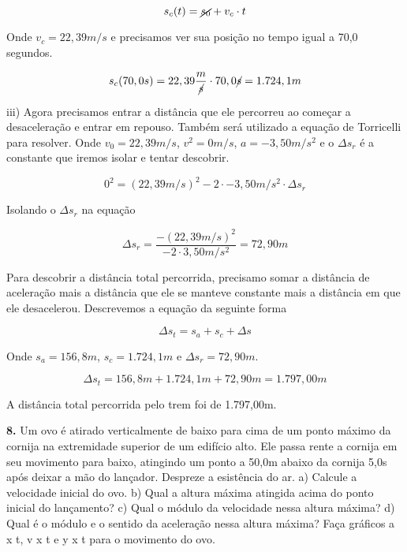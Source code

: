 \documentclass[a4paper, 12pt]{article}
\begin{document}
\begin{flushleft}
		\begin{equation*}
			s_c(t)=\cancel{s_0}+v_c \cdot t
		\end{equation*}
		
		Onde $v_c = 22,39m/s$ e precisamos ver sua posição no tempo igual a 70,0 segundos.
		
		\begin{equation*}
			s_c(70,0s)=22,39\frac{m}{\cancel{s}} \cdot 70,0\cancel{s} = 1.724,1m
		\end{equation*}
		
		iii) Agora precisamos entrar a distância que ele percorreu ao começar a desaceleração e entrar em repouso. Também será utilizado a equação de Torricelli para resolver. Onde $v_0=22,39m/s$, $v^2=0m/s$, $a=-3,50m/s^2$ e o $\Delta{s}_r$ é a constante que iremos isolar e tentar descobrir.
		
		\begin{equation*}
			0^2=(22,39m/s)^2 - 2 \cdot -3,50m/s^2 \cdot \Delta{s} _r
		\end{equation*}
		
		Isolando o $\Delta{s} _r$ na equação
		
		\begin{equation*}
			\Delta{s} _r = \frac{-(22,39m/s)^2}{-2 \cdot 3,50 m/s^2} = 72,90m
		\end{equation*}
		
		Para descobrir a distância total percorrida, precisamo somar a distância de aceleração mais a distância que ele se manteve constante mais a distância em que ele desacelerou. Descrevemos a equação da seguinte forma
		
		\begin{equation*}
			\Delta{s}_t = s_a + s_c + \Delta{s}
		\end{equation*}        
		
		Onde $s_a = 156,8m$, $s_c=1.724,1m$ e $\Delta{s} _r = 72,90m$.
		
		\begin{equation*}
			\Delta{s}_t = 156,8m + 1.724,1m + 72,90m = 1.797,00m
		\end{equation*}
		
		A distância total percorrida pelo trem foi de 1.797,00m.
		
		\vspace{2em}
		
		\textbf{8.} Um ovo é atirado verticalmente de baixo para cima de um ponto máximo da cornija na extremidade superior de um edifício alto. Ele passa rente a cornija em seu movimento para baixo, atingindo um ponto a 50,0m abaixo da cornija 5,0s após deixar a mão do lançador. Despreze a esistência do ar. a) Calcule a velocidade inicial do ovo. b) Qual a altura máxima atingida acima do ponto inicial do lançamento? c) Qual o módulo da velocidade nessa altura máxima? d) Qual é o módulo e o sentido da aceleração nessa altura máxima? Faça gráficos a x t, v x t e y x t para o movimento do ovo.
		

\end{flushleft}
\end{document}
